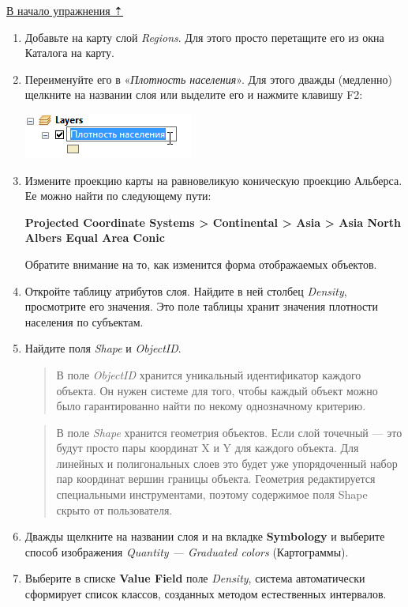 \documentclass[]{book}
\theoremstyle{definition}
\theoremstyle{definition}
\theoremstyle{definition}
\theoremstyle{remark}
\begin{document}
\protect\hyperlink{map-design-economic}{В начало упражнения ⇡}

\begin{enumerate}
\def\labelenumi{\arabic{enumi}.}
\item
  Добавьте на карту слой \emph{Regions}. Для этого просто перетащите его
  из окна Каталога на карту.
\item
  Переименуйте его в «\emph{Плотность населения}». Для этого дважды
  (медленно) щелкните на названии слоя или выделите его и нажмите
  клавишу F2:

  \includegraphics{images/Ex04/image8.png}
\item
  Измените проекцию карты на равновеликую коническую проекцию Альберса.
  Ее можно найти по следующему пути:

  \textbf{Projected Coordinate Systems \textgreater{} Continental
  \textgreater{} Asia \textgreater{} Asia North Albers Equal Area Conic}

  Обратите внимание на то, как изменится форма отображаемых объектов.
\item
  Откройте таблицу атрибутов слоя. Найдите в ней столбец \emph{Density},
  просмотрите его значения. Это поле таблицы хранит значения плотности
  населения по субъектам.
\item
  Найдите поля \emph{Shape} и \emph{ObjectID}.

  \begin{quote}
  В поле \emph{ObjectID} хранится уникальный идентификатор каждого
  объекта. Он нужен системе для того, чтобы каждый объект можно было
  гарантированно найти по некому однозначному критерию.
  \end{quote}

  \begin{quote}
  В поле \emph{Shape} хранится геометрия объектов. Если слой точечный
  --- это будут просто пары координат X и Y для каждого объекта. Для
  линейных и полигональных слоев это будет уже упорядоченный набор пар
  координат вершин границы объекта. Геометрия редактируется специальными
  инструментами, поэтому содержимое поля Shape скрыто от пользователя.
  \end{quote}
\item
  Дважды щелкните на названии слоя и на вкладке \textbf{Symbology} и
  выберите способ изображения \emph{Quantity --- Graduated colors}
  (Картограммы).
\item
  Выберите в списке \textbf{Value Field} поле \emph{Density}, система
  автоматически сформирует список классов, созданных методом
  естественных интервалов.


\end{enumerate}
\end{document}
